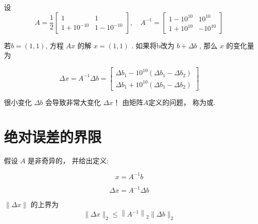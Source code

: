 \begin{example}
    设\begin{equation} A=\frac{1}{2}\left[\begin{array}{cc}1 & 1 \\ 1+10^{-10} & 1-10^{-10}\end{array}\right], \quad A^{-1}=\left[\begin{array}{cc}1-10^{10} & 10^{10} \\ 1+10^{10} & -10^{10}\end{array}\right] \end{equation}

若$ b=(1,1) $, 方程 $ A x $ 的解 $ x=(1,1) $ . 
如果将b改为 $ b+\Delta b $ , 那么 $ x $ 的变化量为

\begin{equation} \Delta x=A^{-1} \Delta b=\left[\begin{array}{l}\Delta b_{1}-10^{10}\left(\Delta b_{1}-\Delta b_{2}\right) \\ \Delta b_{1}+10^{10}\left(\Delta b_{1}-\Delta b_{2}\right)\end{array}\right] \end{equation}
\end{example}


很小变化 $ \Delta b $ 会导致非常大变化 $ \Delta x $！ 由矩阵$A$定义的问题， 称为或. 



\section{绝对误差的界限}

假设 $ A $ 是非奇异的， 并给出定义:

\begin{notation}
    \begin{equation} x=A^{-1} b\end{equation} 
    
    \begin{equation} \Delta x=A^{-1} \Delta b \end{equation}
\end{notation}

\begin{theorem}[绝对误差的界限]
    $ \|\Delta x\| $ 的上界为
    \begin{equation}
    \|\Delta x\|_{2} \leq\left\|A^{-1}\right\|_{2}\|\Delta b\|_{2}
    \end{equation}

\end{theorem}

